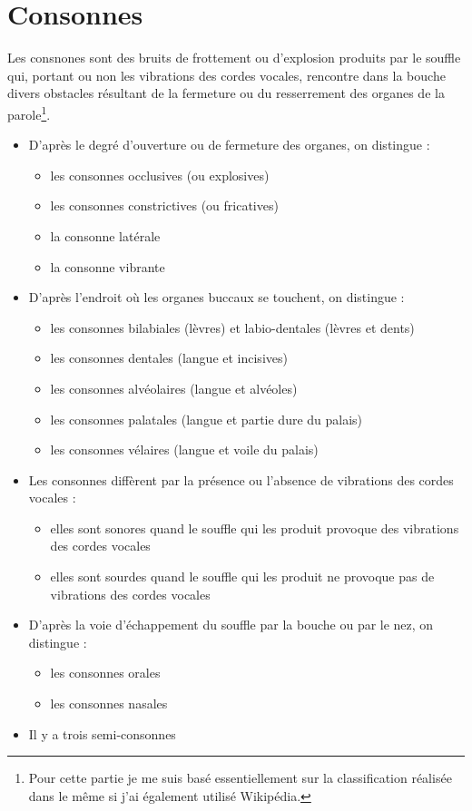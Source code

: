 \chapter{Consonnes}\label{chap:cons}

Les consnones sont des bruits de frottement ou d'explosion produits
par le souffle qui, portant ou non les vibrations des cordes vocales,
rencontre dans la bouche divers obstacles résultant de la fermeture ou
du resserrement des organes de la parole\footnote{Pour cette partie je
me suis basé essentiellement sur la classification réalisée dans le
\GE même si j'ai également utilisé Wikipédia.}.
\newpage
\minitoc
\newpage

\begin{itemize}
\item D'après le degré d'ouverture ou de fermeture des organes, on
  distingue :
  \begin{itemize}
  \item les consonnes occlusives (ou explosives)
  \item les consonnes constrictives (ou fricatives)
  \item la consonne latérale
  \item la consonne vibrante
  \end{itemize}
\item D'après l'endroit où les organes buccaux se touchent, on
  distingue :
  \begin{itemize}
  \item les consonnes bilabiales (lèvres) et labio-dentales (lèvres et
    dents)
  \item les consonnes dentales (langue et incisives)
  \item les consonnes alvéolaires (langue et alvéoles)
  \item les consonnes palatales (langue et partie dure du palais)
  \item les consonnes vélaires (langue et voile du palais)
  \end{itemize}
\item Les consonnes diffèrent par la présence ou l'absence de
  vibrations des cordes vocales :
  \begin{itemize}
  \item elles sont sonores quand le souffle qui les produit provoque
    des vibrations des cordes vocales
  \item elles sont sourdes quand le souffle qui les produit ne
    provoque pas de vibrations des cordes vocales 
  \end{itemize}
\item D'après la voie d'échappement du souffle par la bouche ou par le
  nez, on distingue :
  \begin{itemize}
  \item les consonnes orales
  \item les consonnes nasales
  \end{itemize}
\item Il y a trois semi-consonnes  
\end{itemize}

